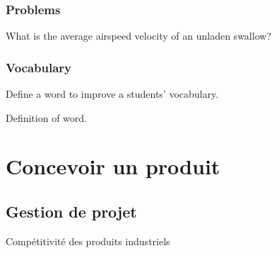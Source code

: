 \documentclass[
	11pt, %
	fleqn, %
	a4paper, %
]{LegrandOrangeBook}
\begin{document}

\section{Problems}

\begin{problem} %
	What is the average airspeed velocity of an unladen swallow?
\end{problem}


\section{Vocabulary}

Define a word to improve a students' vocabulary.

\begin{vocabulary}[Word] %
	Definition of word.
\end{vocabulary}




\part{Concevoir un produit}


\chapter{Gestion de projet}
\begin{corollary}[S1.3]
Compétitivité des produits industriels
\end{corollary}




\chapterspaceabove{6.25cm} %
\chapterspacebelow{7.5cm} %
\end{document}
